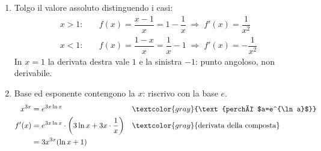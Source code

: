 \begin{question}[ID=1.1, subtitle={Calcolo di derivate — serie 1}, tags={derivate, calcolo}, difficulty=media]
\begin{explanation}
\begin{enumerate}[label=\arabic*)]
    \[\begin{aligned}
    f'(x) &= -\ln2\cdot2^{-x}\cos x+2^{-x}(-\sin x)\\
    &= -2^{-x}(\ln2\,\cos x+\sin x) && \textcolor{gray}{\text{raccolgo $-2^{-x}$}}
    \end{aligned}\]
    \item Tolgo il valore assoluto distinguendo i casi:
    \[\begin{aligned}
    x>1: &\quad f(x)=\dfrac{x-1}{x}=1-\dfrac1x \;\Rightarrow\; f'(x)=\dfrac{1}{x^2}\\
    x<1: &\quad f(x)=\dfrac{1-x}{x}=\dfrac1x-1 \;\Rightarrow\; f'(x)=-\dfrac{1}{x^2}
    \end{aligned}\]
    In $x=1$ la derivata destra vale $1$ e la sinistra $-1$: punto angoloso, non derivabile.
    \item Base ed esponente contengono la $x$: riscrivo con la base $e$.
    \[\begin{aligned}
    x^{3x} &= e^{3x\ln x} && \textcolor{gray}{\text{perché $a=e^{\ln a}$}}\\
    f'(x) &= e^{3x\ln x}\cdot\left(3\ln x+3x\cdot\dfrac1x\right) && \textcolor{gray}{\text{derivata della composta}}\\
    &= 3x^{3x}(\ln x+1)
    \end{aligned}\]
\end{enumerate}
\end{explanation}
\end{question}


